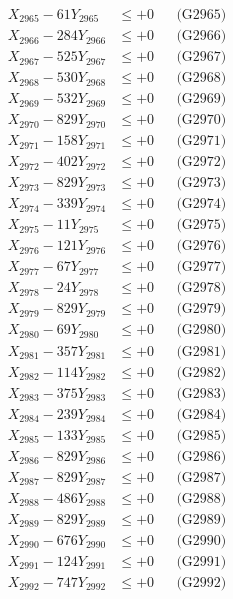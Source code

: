 \documentclass[a4paper,10pt]{article}
\begin{document}
{\begin{align}
X_{2965} - 61Y_{2965} &\leq +0 && \text{(G2965)} \\
X_{2966} - 284Y_{2966} &\leq +0 && \text{(G2966)} \\
X_{2967} - 525Y_{2967} &\leq +0 && \text{(G2967)} \\
X_{2968} - 530Y_{2968} &\leq +0 && \text{(G2968)} \\
X_{2969} - 532Y_{2969} &\leq +0 && \text{(G2969)} \\
X_{2970} - 829Y_{2970} &\leq +0 && \text{(G2970)} \\
\allowbreak
X_{2971} - 158Y_{2971} &\leq +0 && \text{(G2971)} \\
X_{2972} - 402Y_{2972} &\leq +0 && \text{(G2972)} \\
X_{2973} - 829Y_{2973} &\leq +0 && \text{(G2973)} \\
X_{2974} - 339Y_{2974} &\leq +0 && \text{(G2974)} \\
X_{2975} - 11Y_{2975} &\leq +0 && \text{(G2975)} \\
X_{2976} - 121Y_{2976} &\leq +0 && \text{(G2976)} \\
X_{2977} - 67Y_{2977} &\leq +0 && \text{(G2977)} \\
X_{2978} - 24Y_{2978} &\leq +0 && \text{(G2978)} \\
X_{2979} - 829Y_{2979} &\leq +0 && \text{(G2979)} \\
X_{2980} - 69Y_{2980} &\leq +0 && \text{(G2980)} \\
\allowbreak
X_{2981} - 357Y_{2981} &\leq +0 && \text{(G2981)} \\
X_{2982} - 114Y_{2982} &\leq +0 && \text{(G2982)} \\
X_{2983} - 375Y_{2983} &\leq +0 && \text{(G2983)} \\
X_{2984} - 239Y_{2984} &\leq +0 && \text{(G2984)} \\
X_{2985} - 133Y_{2985} &\leq +0 && \text{(G2985)} \\
X_{2986} - 829Y_{2986} &\leq +0 && \text{(G2986)} \\
X_{2987} - 829Y_{2987} &\leq +0 && \text{(G2987)} \\
X_{2988} - 486Y_{2988} &\leq +0 && \text{(G2988)} \\
X_{2989} - 829Y_{2989} &\leq +0 && \text{(G2989)} \\
X_{2990} - 676Y_{2990} &\leq +0 && \text{(G2990)} \\
\allowbreak
X_{2991} - 124Y_{2991} &\leq +0 && \text{(G2991)} \\
X_{2992} - 747Y_{2992} &\leq +0 && \text{(G2992)} \\

\end{align}}
\end{document}
